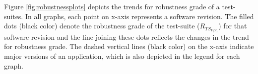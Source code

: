 Figure \ref{fig:robustnessplots} depicts the trends for robustness grade of a test-suites. In all graphs, each point on x-axis represents a software revision. The filled dots (black color) denote the robustness grade of the test-suite  ($R_{TS_{V_{0}V_{1}}}$) for that software revision and the line joining these dots reflects the changes in the trend for robustness grade. The dashed vertical lines (black color) on the x-axis indicate major versions of an application, which is also depicted in the legend for each graph. 


\begin{figure}[ht!] 
\centering     %
\vspace{-2mm}
\vspace{-2mm}
\vspace{-2mm}

\end{figure}
